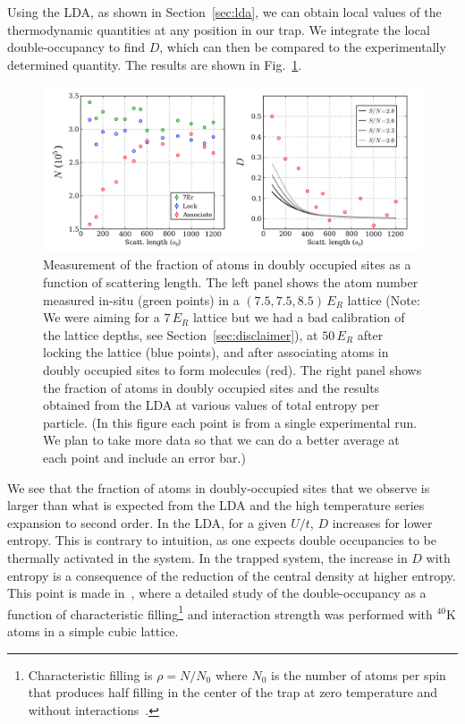 \documentclass[11pt,letter]{article}
\begin{document}
Using the LDA,
as shown in Section~\ref{sec:lda}, we can obtain local values of the
thermodynamic quantities at any position in our trap.   We integrate the local
double-occupancy to find $D$, which can then be compared to the experimentally
determined quantity. The results are shown in
Fig.~\ref{fig:doubleocc_Comp_data}.  
\begin{figure} \centering
\includegraphics[width=\textwidth]{../Ut_Comp/doubleocc_.png}
\caption[Measurement of the fraction of atoms in doubly occupied sites as a
function of scattering length. ]{\small Measurement of the fraction of atoms in
doubly occupied sites as a function of scattering length.  The left panel shows
the atom number measured in-situ (green points) in a  $(7.5, 7.5, 8.5) \,E_{R}$
lattice (Note: We were aiming for a $7\,E_{R}$ lattice but we had a bad
calibration of the lattice depths, see Section~\ref{sec:disclaimer}), at
$50\,E_{R}$ after locking the lattice (blue points), and after associating
atoms in doubly occupied sites to form molecules (red).  The right panel shows
the fraction of atoms in doubly occupied sites and the results obtained from
the LDA at various values of total entropy per particle. (In this figure each
point is from a single experimental run.  We plan to take more data so that we
can do a better average at each point and include an error bar.)  }
\label{fig:doubleocc_Comp_data} 
\end{figure}

We see that the fraction of atoms in doubly-occupied sites that we observe is
larger than what is expected from the LDA and the high temperature series
expansion to second order.  In the LDA, for a given $U/t$, $D$ increases for
lower entropy.  This is contrary to intuition, as one expects double
occupancies to be thermally activated in the system.  In the trapped system, the
increase in $D$ with entropy is a consequence of the reduction of the central
density at higher entropy.  This point is made
in~\cite{Jordens2010b}, where a detailed study of the double-occupancy as a
function of  characteristic filling\footnote{Characteristic filling is
$\rho=N/N_{0}$ where $N_{0}$ is the number of atoms per spin that produces half
filling in the center of the trap at zero temperature and without
interactions~\cite{Jordens2010b}.} and interaction strength was performed with
$^{40}$K atoms in a simple cubic lattice.   
\end{document}
